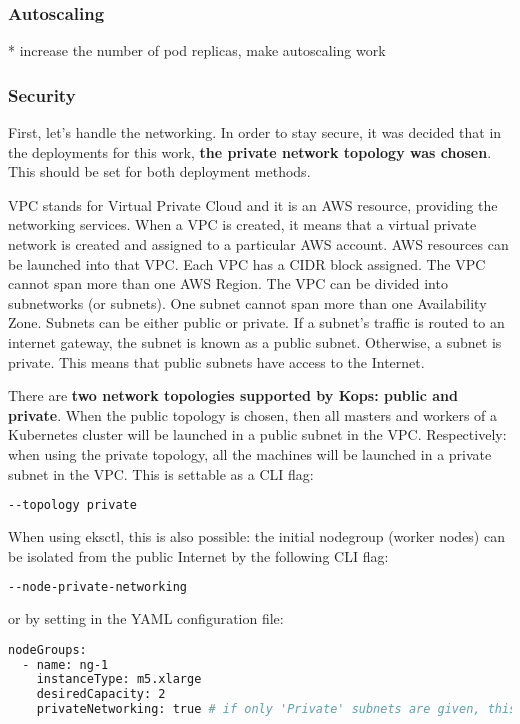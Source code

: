 \subsubsection{Autoscaling}

* increase the number of pod replicas, make autoscaling work

\subsubsection{Security}


First, let's handle the networking. In order to stay secure, it was decided that in the deployments for this work, \textbf{the private network topology was chosen}. This should be set for both deployment methods.

VPC stands for Virtual Private Cloud and it is an AWS resource, providing the networking services. When a VPC is created, it means that a virtual private network is created and assigned to a particular AWS account. AWS resources can be launched into that VPC. Each VPC has a CIDR block assigned. The VPC cannot span more than one AWS Region. The VPC can be divided into subnetworks (or subnets). One subnet cannot span more than one Availability Zone. Subnets can be either public or private. If a subnet's traffic is routed to an internet gateway, the subnet is known as a public subnet. Otherwise, a subnet is private\cite{aws-vpc}. This means that public subnets have access to the Internet.

There are \textbf{two network topologies supported by Kops: public and private}. When the public topology is chosen, then all masters and workers of a Kubernetes cluster will be launched in a public subnet in the VPC. Respectively: when using the private topology, all the machines will be launched in a private subnet in the VPC\cite{kops-net-topo}. This is settable as a CLI flag\cite{kops-net}:
\begin{lstlisting}[basicstyle=\small,caption={CLI flag used by kops to set private networking mode},captionpos=b,language=Bash,xleftmargin=1cm]
--topology private
\end{lstlisting}

When using eksctl, this is also possible: the initial nodegroup (worker nodes) can be isolated from the public Internet by the following CLI flag\cite{eksctl-net}:
\begin{lstlisting}[basicstyle=\small,caption={CLI flag used by eksctl to set private networking mode},captionpos=b,language=Bash,xleftmargin=1cm]
--node-private-networking
\end{lstlisting}
or by setting in the YAML configuration file\cite{eks-example}:
\begin{lstlisting}[basicstyle=\small,caption={YAML configuration used by Kops to set private networking mode},captionpos=b,language=Bash,xleftmargin=1cm]
nodeGroups:
  - name: ng-1
    instanceType: m5.xlarge
    desiredCapacity: 2
    privateNetworking: true # if only 'Private' subnets are given, this must be enabled
\end{lstlisting}

